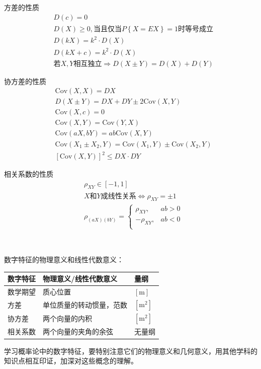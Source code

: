 方差的性质
\begin{align*}
&D\left( c \right) =0 \\
&D\left( X \right) \geqslant 0, \text{当且仅当}P\left\{ X=EX \right\} =1\text{时等号成立} \\
&D\left( kX \right) =k^2\cdot D\left( X \right) \\
&D\left( kX+c \right) =k^2\cdot D\left( X \right) \\
&\text{若}X,Y\text{相互独立}\Rightarrow D\left( X\pm Y \right) =D\left( X \right) +D\left( Y \right)
\end{align*}

协方差的性质
\begin{align*}
&\mathrm{Cov}\left( X,X \right) =DX \\
&D\left( X\pm Y \right) =DX+DY\pm 2\mathrm{Cov}\left( X,Y \right) \\
&\mathrm{Cov}\left( X,c \right) =0 \\
&\mathrm{Cov}\left( X,Y \right) =\mathrm{Cov}\left( Y,X \right) \\
&\mathrm{Cov}\left( aX,bY \right) =ab\mathrm{Cov}\left( X,Y \right) \\
&\mathrm{Cov}\left( X_1\pm X_2,Y \right) =\mathrm{Cov}\left( X_1,Y \right) \pm \mathrm{Cov}\left( X_2,Y \right) \\
&\left[ \mathrm{Cov}\left( X,Y \right) \right] ^2\leqslant DX\cdot DY
\end{align*}

相关系数的性质
\begin{align*}
&\rho _{XY}\in \left[ -1,1 \right] \\
&X\text{和}Y\text{成线性关系}\Leftrightarrow \rho _{XY}=\pm 1 \\
&\rho _{\left( aX \right) \left( bY \right)}=\begin{cases}
	\rho _{XY},&		ab>0\\
	-\rho _{XY},&		ab<0\\
\end{cases}
\end{align*}

~

数字特征的物理意义和线性代数意义：
\begin{table}[h]
\centering
\begin{tabular}{lll}
    \toprule
    数字特征 & 物理意义/线性代数意义 & 量纲\\
    \midrule
    数学期望 & 质心位置 & $\left[ \mathrm{m} \right] $\\
    方差 & 单位质量的转动惯量，范数 & $\left[ \mathrm{m}^2 \right] $\\
    协方差 & 两个向量的内积 & $\left[ \mathrm{m}^2 \right] $\\
    相关系数 & 两个向量的夹角的余弦 & 无量纲\\
    \bottomrule
\end{tabular}
\end{table}

学习概率论中的数字特征，要特别注意它们的物理意义和几何意义，用其他学科的知识点相互印证，加深对这些概念的理解。




